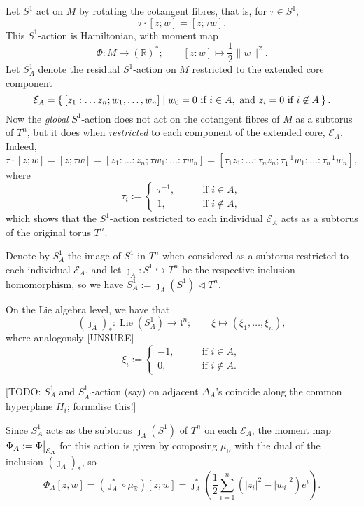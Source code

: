 \documentclass{article}
\newcommand{\lra}{\longrightarrow}
\newcommand{\RR}{\mathbb{R}}
\newcommand{\mcE}{\mathcal{E}}
\newcommand{\mft}{\mathfrak{t}}
\DeclareMathOperator{\Lie}{Lie}
\newcommand\restr[2]{{%
		\left.\kern-\nulldelimiterspace %
		#1 %
		\vphantom{\big|} %
		\right|_{#2} %
}}
\begin{document}
	Let $S^{1}$ act on $M$ by rotating the cotangent fibres, that is, for $\tau \in S^{1}$,
	\[
		\tau \cdot [z; w] = [z; \tau w].
	\]
	This $S^{1}$-action is Hamiltonian, with moment map
	\[
		\Phi : M \lra (\RR)^{\ast}; \qquad [z:w] \longmapsto \frac{1}{2} \|w\|^{2}.
	\]
	Let $S_{A}^{1}$ denote the residual $S^{1}$-action on $M$ restricted to the extended core component 
	\[
		\mcE_{A} = \Set{ [z_{1}: \ldots z_{n}; w_{1}, \ldots, w_{n}] | w_{0} = 0 \text{ if } i \in A, \text{ and } z_{i} = 0 \text{ if } i \not\in A }.
	\]
	Now the \emph{global }$S^{1}$-action does not act on the cotangent fibres of $M$ as a subtorus of $T^{n}$, but it does when \emph{restricted} to each component of the extended core, $\mcE_{A}$. Indeed,
	\[
		\tau \cdot [z; w] = [z; \tau w] = [z_{1} : \ldots : z_{n} ; \tau w_{1} : \ldots : \tau w_{n} ] = [\tau_{1 }z_{1} : \ldots : \tau_{n}z_{n} ; \tau_{1}^{-1}w_{1} : \ldots : \tau_{n}^{-1} w_{n} ],
	\]
	where
	\[
		\tau_{i} :=
		\begin{cases}
			\tau^{-1}, \qquad &\text{if } i \in A, \\
			1, \qquad &\text{if } i \not\in A,
		\end{cases}
	\]
	which shows that the $S^{1}$-action restricted to each individual $\mcE_{A}$ acts as a subtorus of the original torus $T^{n}$.
	
	Denote by $S_{A}^{1}$ the image of $S^{1}$ in $T^{n}$ when considered as a subtorus restricted to each individual $\mcE_{A}$, and let $\jmath_{A} : S^{1} \hookrightarrow T^{n}$ be the respective inclusion homomorphism, so we have $S_{A}^{1} := \jmath_{A}(S^{1}) \lhd T^{n}$.
	
	On the Lie algebra level, we have that
	\[
		(\jmath_{A})_{\ast} : \Lie(S_{A}^{1})  \lra \mft^{n}; \qquad \xi \longmapsto ( \xi_{1}, \ldots, \xi_{n}),
	\]
	where analogously [UNSURE]
	\[
		\xi_{i} :=
		\begin{cases}
			-1, \qquad &\text{if } i \in A, \\
			0, \qquad &\text{if } i \not\in A.
		\end{cases}
	\]
	
	[TODO: $S^{1}_{A}$ and $S_{A^{\prime}}^{1}$-action (say) on adjacent $\Delta_{A}$'s coincide along the common hyperplane $H_{i}$; formalise this!]
	
	Since $S_{A}^{1}$ acts as the subtorus $\jmath_{A}(S^{1})$ of $T^{n}$ on each $\mcE_{A}$, the moment map $\Phi_{A} := \restr{\Phi}{\mcE_{A}}$ for this action is given by composing $\mu_{\RR}$ with the dual of the inclusion $(\jmath_{A})_{\ast}$, so
	\[
		\Phi_{A}[z,w] = \left( \jmath_{A}^{\ast} \circ \mu_{\RR} \right)[z;w] = \jmath_{A}^{\ast} \left( \frac{1}{2} \sum_{i = 1}^{n} \left( |z_{i}|^{2} - |w_{i}|^{2} \right) e^{i} \right).
	\]
	
\end{document}
